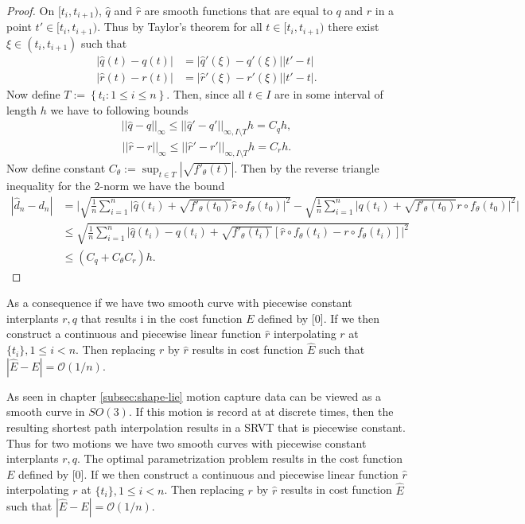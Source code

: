 \begin{proof}
  On  \([t_i, t_{i+1})\),  \(\hat q\) and  \(\hat r\) are smooth functions that are equal to  \(q\) and  \(r\) in a point  \(t' \in [t_i, t_{i+1})\). Thus by Taylor's theorem for all  \(t \in [t_i, t_{i+1})\) there exist  \(\xi \in (t_i, t_{i+1})\) such that
  \begin{eqnarray}
    |\hat q(t) - q(t)|  &= |\hat q'(\xi) - q'(\xi)||t' - t| \\
    |\hat r(t) - r(t)|  &= |\hat r'(\xi) - r'(\xi)||t' - t|.
  \end{eqnarray}
  Now define  \(T:= \left \{t_i : 1 \leq i \leq n \right \} \). Then, since all  \(t \in I\) are in some interval of length  \(h\) we have to following bounds
  \begin{eqnarray}
    ||\hat q - q||_{\infty} \leq ||\hat q' - q'||_{\infty, I \setminus T}h = C_q h,
  \end{eqnarray}
  \begin{eqnarray}
    ||\hat r - r||_{\infty} \leq ||\hat r' - r'||_{\infty, I \setminus T}h = C_r h.
  \end{eqnarray}
  Now define constant  \(C_{\theta}:= \sup_{t\in T} | \sqrt{f'_\theta(t)} | \). Then by the reverse triangle inequality for the 2-norm we have the bound
  \begin{align}
    |\hat d_n - d_n | 
      & = \Bigg| \sqrt{\frac{1}{n}\sum_{i=1}^{n}\Big|\hat q(t_i) + \sqrt{f'_{\theta}(t_0)} \hat r \circ f_{\theta}(t_0)\Big|^2}-\sqrt{\frac{1}{n}\sum_{i=1}^{n}\Big|q(t_i) + \sqrt{f'_{\theta}(t_0)} r \circ f_{\theta}(t_0)\Big|^2 } \Bigg|\\
     & \leq \sqrt{\frac{1}{n}\sum_{i=1}^{n}\Big|\hat q(t_i) - q(t_i)  + \sqrt{f'_{\theta}(t_i)}\left[  \hat r \circ f_{\theta}(t_i) - r \circ f_{\theta}(t_i)\right]\Big|^2}\\
     & \leq \left(C_q  + C_{\theta} C_r \right)h.
  \end{align}
\end{proof}

As a consequence if we have two smooth curve with piecewise constant interplants \(r, q\) that results i in the cost function \(E\) defined by [0]. If we then construct a continuous and piecewise linear function \(\hat r\) interpolating \(r\) at \(\{t_i\}, 1 \leq i <n\). Then replacing \(r\) by \(\hat r\) results in cost function $\hat{E}$ such that \(|\hat{E} - E |= \mathcal{O}(1/n)\). 

As seen in chapter \ref{subsec:shape-lie} motion capture data can be viewed as a smooth curve in \(SO(3)\). If this motion is record at at discrete times, then the resulting shortest path interpolation results in a SRVT that is piecewise constant. Thus for two motions we have two smooth curves with piecewise constant interplants \(r, q\). The optimal parametrization problem results in the cost function \(E\) defined by [0]. If we then construct a continuous and piecewise linear function \(\hat r\) interpolating \(r\) at \(\{t_i\}, 1 \leq i <n\). Then replacing \(r\) by \(\hat r\) results in cost function $\hat{E}$ such that \(|\hat{E} - E |= \mathcal{O}(1/n)\). 